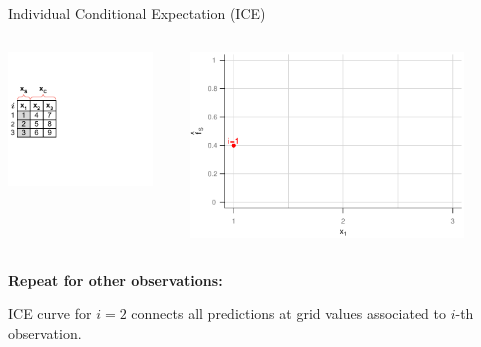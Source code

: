 \documentclass[11pt,compress,t,notes=noshow, aspectratio=169, xcolor=table]{beamer}
\begin{document}
\begin{frame}{Individual Conditional Expectation (ICE)}

\begin{columns}[T]
\begin{column}{0.4\textwidth}
\includegraphics[page=6, trim=0cm 0.35cm 0.85cm 0.35cm, width=0.9\textwidth]{figure_man/ice_plot_demo}
\end{column}
\begin{column}{0.55\textwidth}
\includegraphics[page=4, width=0.85\textwidth]{figure/ICE}
\end{column}
\end{columns}
\vspace*{\topsep}

\textbf{Repeat for other observations:}

ICE curve for $i=2$ connects all predictions at grid values associated to $i$-th observation.
\end{frame}
\end{document}
